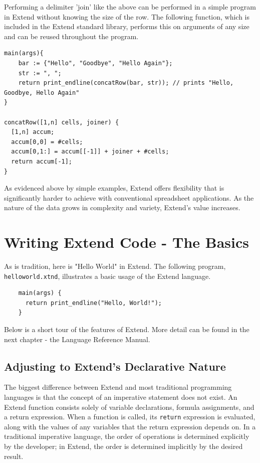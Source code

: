 \medskip \noindent Performing a delimiter 'join' like the above can be performed in a simple program in Extend without knowing the size of the row. The following function, which is included in the Extend standard library, performs this on arguments of any size and can be reused throughout the program.

\begin{lstlisting}
main(args){
	bar := {"Hello", "Goodbye", "Hello Again"};
	str := ", ";
	return print_endline(concatRow(bar, str)); // prints "Hello, Goodbye, Hello Again"
}

concatRow([1,n] cells, joiner) {
  [1,n] accum;
  accum[0,0] = #cells;
  accum[0,1:] = accum[[-1]] + joiner + #cells;
  return accum[-1];
}
\end{lstlisting}

\medskip \noindent As evidenced above by simple examples, Extend offers flexibility that is significantly harder to achieve with conventional spreadsheet applications. As the nature of the data grows in complexity and variety, Extend's value increases.

\section{Writing Extend Code - The Basics}
As is tradition, here is "Hello World" in Extend. The following program, \texttt{helloworld.xtnd}, illustrates a basic usage of the Extend language.

\begin{lstlisting}
	main(args) {
	  return print_endline("Hello, World!");
	}
\end{lstlisting}

\medskip \noindent
Below is a short tour of the features of Extend. More detail can be found in the next chapter - the Language Reference Manual.

	\subsection{Adjusting to Extend's Declarative Nature}
	The biggest difference between Extend and most traditional programming languages is that the concept of an imperative statement does not exist. An Extend function consists solely of variable declarations, formula assignments, and a return expression. When a function is called, its \texttt{return} expression is evaluated, along with the values of any variables that the return expression depends on. In a traditional imperative language, the order of operations is determined explicitly by the developer; in Extend, the order is determined implicitly by the desired result.


